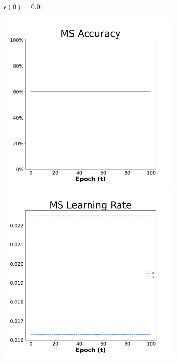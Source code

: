 \begin{figure}[H]
\begin{subfigure}{0.3\textwidth}
  \caption{$\epsilon(0)=0.01$}
\end{subfigure}\hfil %
\begin{subfigure}{0.3\textwidth}
  \includegraphics[width=\linewidth]{images/exper1/NSP/MS_0.03_acc.png}
  \includegraphics[width=\linewidth]{images/exper1/NSP/MS_0.03_lr.png}

\end{subfigure}
\end{figure}
